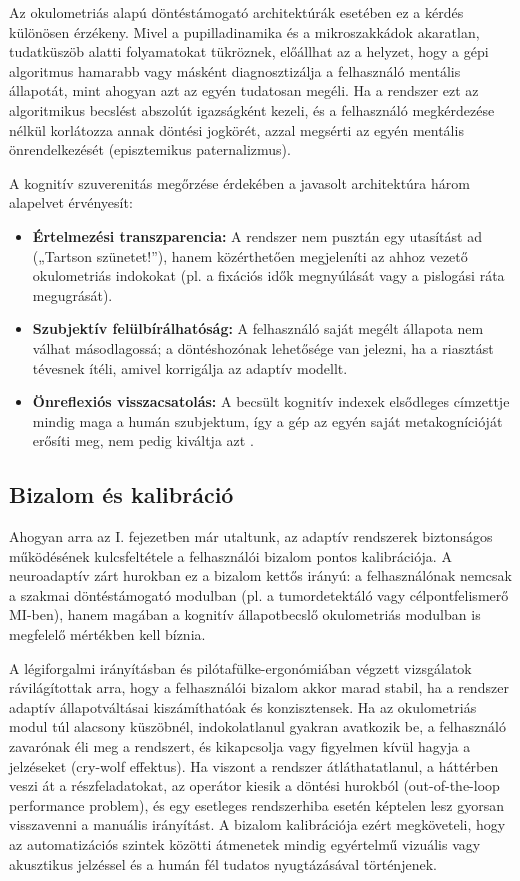 \documentclass[12pt,a4paper,oneside]{book}
\begin{document}
Az okulometriás alapú döntéstámogató architektúrák esetében ez a kérdés különösen érzékeny. Mivel a pupilladinamika és a mikroszakkádok akaratlan, tudatküszöb alatti folyamatokat tükröznek, előállhat az a helyzet, hogy a gépi algoritmus hamarabb vagy másként diagnosztizálja a felhasználó mentális állapotát, mint ahogyan azt az egyén tudatosan megéli. Ha a rendszer ezt az algoritmikus becslést abszolút igazságként kezeli, és a felhasználó megkérdezése nélkül korlátozza annak döntési jogkörét, azzal megsérti az egyén mentális önrendelkezését (episztemikus paternalizmus).

A kognitív szuverenitás megőrzése érdekében a javasolt architektúra három alapelvet érvényesít:
\begin{itemize}
    \item \textbf{Értelmezési transzparencia:} A rendszer nem pusztán egy utasítást ad („Tartson szünetet!”), hanem közérthetően megjeleníti az ahhoz vezető okulometriás indokokat (pl. a fixációs idők megnyúlását vagy a pislogási ráta megugrását).
    \item \textbf{Szubjektív felülbírálhatóság:} A felhasználó saját megélt állapota nem válhat másodlagossá; a döntéshozónak lehetősége van jelezni, ha a riasztást tévesnek ítéli, amivel korrigálja az adaptív modellt.
    \item \textbf{Önreflexiós visszacsatolás:} A becsült kognitív indexek elsődleges címzettje mindig maga a humán szubjektum, így a gép az egyén saját metakognícióját erősíti meg, nem pedig kiváltja azt \cite{tanveer2026}.
\end{itemize}

\subsection{Bizalom és kalibráció}

Ahogyan arra az I. fejezetben már utaltunk, az adaptív rendszerek biztonságos működésének kulcsfeltétele a felhasználói bizalom pontos kalibrációja. A neuroadaptív zárt hurokban ez a bizalom kettős irányú: a felhasználónak nemcsak a szakmai döntéstámogató modulban (pl. a tumordetektáló vagy célpontfelismerő MI-ben), hanem magában a kognitív állapotbecslő okulometriás modulban is megfelelő mértékben kell bíznia.

A légiforgalmi irányításban és pilótafülke-ergonómiában végzett vizsgálatok rávilágítottak arra, hogy a felhasználói bizalom akkor marad stabil, ha a rendszer adaptív állapotváltásai kiszámíthatóak és konzisztensek. Ha az okulometriás modul túl alacsony küszöbnél, indokolatlanul gyakran avatkozik be, a felhasználó zavarónak éli meg a rendszert, és kikapcsolja vagy figyelmen kívül hagyja a jelzéseket (cry-wolf effektus). Ha viszont a rendszer átláthatatlanul, a háttérben veszi át a részfeladatokat, az operátor kiesik a döntési hurokból (out-of-the-loop performance problem), és egy esetleges rendszerhiba esetén képtelen lesz gyorsan visszavenni a manuális irányítást. A bizalom kalibrációja ezért megköveteli, hogy az automatizációs szintek közötti átmenetek mindig egyértelmű vizuális vagy akusztikus jelzéssel és a humán fél tudatos nyugtázásával történjenek.
\end{document}
